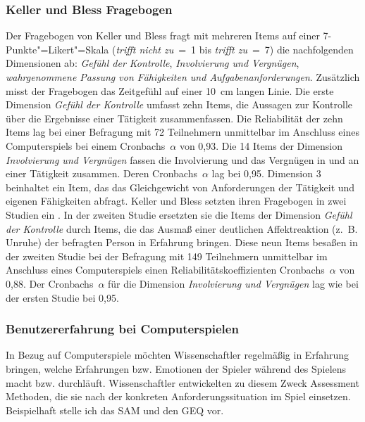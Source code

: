 \subsubsection{Keller und Bless Fragebogen} 

\label{ssub:keller_und_bless_fragebogen}

Der Fragebogen von Keller und Bless fragt mit mehreren Items auf einer 7-Punkte"=Likert"=Skala (\emph{trifft nicht zu}~=~1 bis \emph{trifft zu}~=~7) die nachfolgenden Dimensionen ab: \emph{Gefühl der Kontrolle}, \emph{Involvierung und Vergnügen}, \emph{wahrgenommene Passung von Fähigkeiten und Aufgabenanforderungen}. Zusätzlich misst der Fragebogen das Zeitgefühl auf einer 10~cm langen Linie. Die erste Dimension \emph{Gefühl der Kontrolle} umfasst zehn Items, die Aussagen zur Kontrolle über die Ergebnisse einer Tätigkeit zusammenfassen. Die Reliabilität der zehn Items lag bei einer Befragung mit 72 Teilnehmern unmittelbar im Anschluss eines Computerspiels bei einem Cronbachs~$\alpha$ von 0,93. Die 14 Items der Dimension \emph{Involvierung und Vergnügen} fassen die Involvierung und das Vergnügen in und an einer Tätigkeit zusammen. Deren Cronbachs~$\alpha$ lag bei 0,95. Dimension 3 beinhaltet ein Item, das das Gleichgewicht von Anforderungen der Tätigkeit und eigenen Fähigkeiten abfragt. Keller und Bless setzten ihren Fragebogen in zwei Studien ein \citep{Keller2008}. In der zweiten Studie ersetzten sie die Items der Dimension \emph{Gefühl der Kontrolle} durch Items, die das Ausmaß einer deutlichen Affektreaktion (z.~B. Unruhe) der befragten Person in Erfahrung bringen. Diese neun Items besaßen in der zweiten Studie bei der Befragung mit 149 Teilnehmern unmittelbar im Anschluss eines Computerspiels einen Reliabilitätskoeffizienten Cronbachs~$\alpha$ von 0,88. Der Cronbachs~$\alpha$ für die Dimension \emph{Involvierung und Vergnügen} lag wie bei der ersten Studie bei 0,95.

\subsubsection{Benutzererfahrung bei Computerspielen} 

\label{ssub:benutzererfahrung_bei_computerspielen}

In Bezug auf Computerspiele möchten Wissenschaftler regelmäßig in Erfahrung bringen, welche Erfahrungen bzw. Emotionen der Spieler während des Spielens macht bzw. durchläuft. Wissenschaftler entwickelten zu diesem Zweck Assessment Methoden, die sie nach der konkreten Anforderungssituation im Spiel einsetzen. Beispielhaft stelle ich das \ac{SAM} und den \ac{GEQ} vor. 

